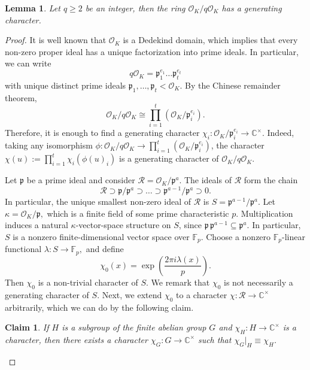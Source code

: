 \documentclass[11pt]{article}
\theoremstyle{plain}
\newtheorem{claim}[theorem]{Claim}
\newtheorem{lemma}[theorem]{Lemma}
\theoremstyle{definition}
\begin{document}
	\begin{lemma}\label{lemma:character}
		Let $q\geq 2$ be an integer, then the ring $\mathcal{O}_K/q\mathcal{O}_K$ has a generating character.
	\end{lemma}
	
	\begin{proof}
		It is well known that $\mathcal{O}_K$ is a Dedekind domain, which implies that every non-zero proper ideal has a unique factorization into prime ideals. In particular, we can write
		$$q\mathcal{O}_K=\mathfrak{p}_1^{e_1}\dots\mathfrak{p}_t^{e_t}$$
		with unique distinct prime ideals $\mathfrak{p}_1,\dots,\mathfrak{p}_t<\mathcal{O}_K$. By the Chinese remainder theorem,
		$$\mathcal{O}_K/q\mathcal{O}_K\cong\prod_{i=1}^t (\mathcal{O}_K/\mathfrak{p}_i^{e_i}).$$
		Therefore, it is enough to find a generating character $\chi_i:\mathcal{O}_K/\mathfrak{p}_i^{e_i}\rightarrow \mathbb{C}^{\times}$. Indeed,  taking any isomorphism $\phi:\mathcal{O}_K/q\mathcal{O}_K\rightarrow\prod_{i=1}^t (\mathcal{O}_K/\mathfrak{p}_i^{e_i})$, the character $\chi(u):=\prod_{i=1}^t\chi_i(\phi(u)_i)$ is a generating character of $\mathcal{O}_K/ q\mathcal{O}_K$.
		
		Let $\mathfrak{p}$ be a prime ideal and consider $\mathcal{R}=\mathcal{O}_K/\mathfrak{p}^{a}$. The ideals of $\mathcal{R}$ form the chain $$\mathcal{R}\supset \mathfrak{p}/\mathfrak{p}^{a}\supset\dots\supset \mathfrak{p}^{a-1}/\mathfrak{p}^{a}\supset 0.$$ In particular, the unique smallest non-zero ideal of $\mathcal{R}$ is $S=\mathfrak{p}^{a-1}/\mathfrak{p}^{a}$. Let
		$\kappa=\mathcal O_K/\mathfrak p,$
		which is a finite field of some prime characteristic $p$. Multiplication
		induces a natural $\kappa$-vector-space structure on $S$,
		since $\mathfrak p\,\mathfrak p^{a-1}\subseteq\mathfrak p^a.$
		In particular, $S$ is a nonzero finite-dimensional vector space over
		$\mathbb F_p$. Choose a nonzero $\mathbb F_p$-linear functional
		$\lambda:S\longrightarrow\mathbb F_p,$
		and define
		\[
		\chi_0(x)
		=
		\exp\left(\frac{2\pi i\lambda(x)}{p}\right).
		\]
		Then $\chi_0$ is a non-trivial character of $S$. We remark that $\chi_0$ is not necessarily a generating character of $S$. Next, we extend $\chi_0$ to a character $\chi:\mathcal{R}\rightarrow\mathbb{C}^{\times}$ arbitrarily, which we can do by the following claim.
		
		\begin{claim}
			If $H$ is a subgroup of the finite abelian group $G$ and $\chi_H:H\rightarrow\mathbb{C}^{\times}$ is a character, then there exists a character $\chi_G:G\rightarrow \mathbb{C}^{\times}$ such that $\chi_G|_H\equiv \chi_H$.
		\end{claim}
		

\end{proof}
\end{document}

